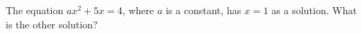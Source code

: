 The equation $ax^2+5x=4$, where $a$ is a constant, has $x=1$ as a solution. What is the other solution?
